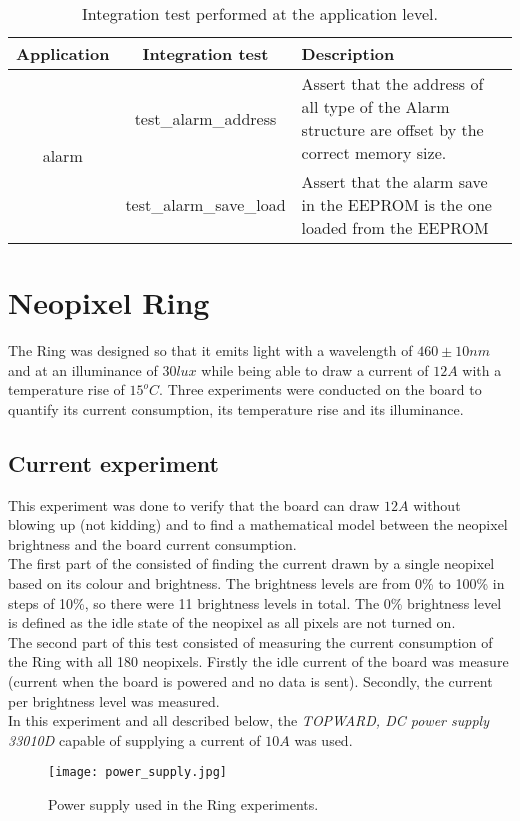 \begin{table}[h!]
	\centering
	\caption{Integration test performed at the application level.}
	\label{table:integrationTest}
	\begin{tabular}{ccp{18em}}
		\hline
		\toprule
		\textbf{Application} & \textbf{Integration test} & \textbf{Description}\\
		\bottomrule
		\toprule
		\multirow{6}{*}{alarm} & test\_alarm\_address & Assert that the address of all type of the Alarm structure are offset by the correct memory size.\\
		& test\_alarm\_save\_load & Assert that the alarm save in the EEPROM is the one loaded from the EEPROM\\ 
		\bottomrule
		\hline
	\end{tabular}
\end{table}

\section{Neopixel Ring}
The Ring was designed so that it emits light with a wavelength of $460\pm 10nm$ and at an illuminance of  $30lux$ while being able to draw a current of $12A$ with a temperature rise of $15^oC$. Three experiments were conducted on the board to quantify its current consumption, its temperature rise and its illuminance.  

\subsection{Current experiment}
This experiment was done to verify that the board can draw $12A$ without blowing up (not kidding) and to find a mathematical model between the neopixel brightness and the board current consumption.\\
The first part of the consisted of finding the current drawn by a single neopixel based on its colour and brightness. The brightness levels are from 0\% to 100\% in steps of 10\%, so there were 11 brightness levels in total. The 0\% brightness level is defined as the idle state of the neopixel as all pixels are not turned on.\\
The second part of this test consisted of measuring the current consumption of the Ring with all 180 neopixels. Firstly the idle current of the board was measure (current when the board is powered and no data is sent). Secondly, the current per brightness level was measured.\\
In this experiment and all described below, the \textit{TOPWARD, DC power supply 33010D} capable of supplying a current of $10A$ was used.
\begin{figure}[ht]
	\centering
	\texttt{[image: power\_supply.jpg]}
	\caption{Power supply used in the Ring experiments.}
	\label{fig:power_supply}
\end{figure}
